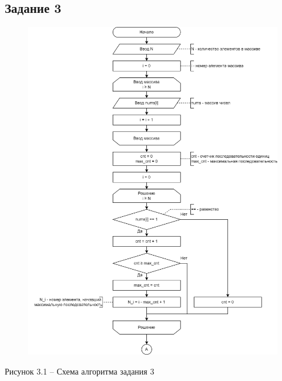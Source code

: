 \documentclass[a4paper,14pt]{extarticle}
\begin{document}
  \subsection*{Задание 3}
  \begin{figure}[h]
    \centering
    \includegraphics[width=0.89\linewidth]{schemes/s-3-1}
  \end{figure}
  \begin{center}
    Рисунок 3.1 – Схема алгоритма задания 3
  \end{center}
\end{document}
